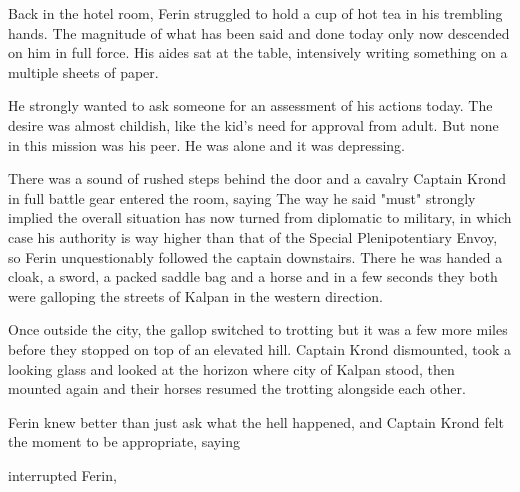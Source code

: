 Back in the hotel room, Ferin struggled to hold a cup of hot tea in his trembling hands. The magnitude of what has been said and done today only now descended on him in full force. His aides sat at the table, intensively writing something on a multiple sheets of paper.

He strongly wanted to ask someone for an assessment of his actions today. The desire was almost childish, like the kid's need for approval from adult. But none in this mission was his peer. He was alone and it was depressing.

There was a sound of rushed steps behind the door and a cavalry Captain Krond in full battle gear entered the room, saying  The way he said "must" strongly implied the overall situation has now turned from diplomatic to military, in which case his authority is way higher than that of the Special Plenipotentiary Envoy, so Ferin unquestionably followed the captain downstairs. There he was handed a cloak, a sword, a packed saddle bag and a horse and in a few seconds they both were galloping the streets of Kalpan in the western direction.

Once outside the city, the gallop switched to trotting but it was a few more miles before they stopped on top of an elevated hill. Captain Krond dismounted, took a looking glass and looked at the horizon where city of Kalpan stood, then mounted again and their horses resumed the trotting alongside each other.

Ferin knew better than just ask what the hell happened, and Captain Krond felt the moment to be appropriate, saying 

 interrupted Ferin, 

